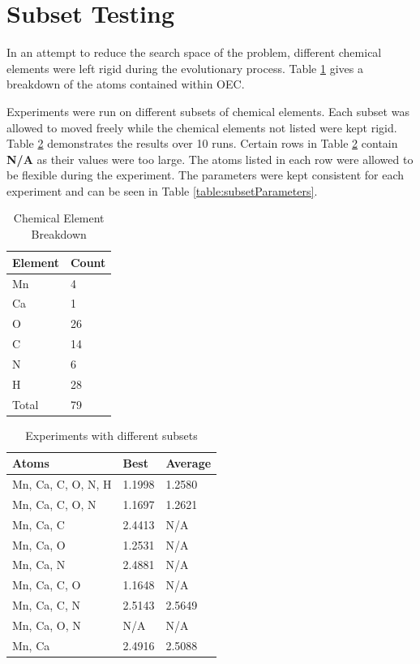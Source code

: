 \documentclass[conference]{IEEEtran}
\begin{document}
\section{Subset Testing}
\label{sec:subsetTesting}

In an attempt to reduce the search space of the problem, different chemical elements were left rigid during the evolutionary process. Table \ref{table:elementBreakdown} gives a breakdown of the atoms contained within OEC.

Experiments were run on different subsets of chemical elements. Each subset was allowed to moved freely while the chemical elements not listed were kept rigid. Table \ref{table:subsetResults} demonstrates the results over 10 runs. Certain rows in Table \ref{table:subsetResults} contain \textbf{N/A} as their values were too large. The atoms listed in each row were allowed to be flexible during the experiment. The parameters were kept consistent for each experiment and can be seen in Table \ref{table:subsetParameters}.

\begin{table}
\caption{Chemical Element Breakdown}
\label{table:elementBreakdown}
\centering
\normalsize
\begin{tabular}{ | l | l | }
  \hline
    Element & Count \\ \hline
    Mn & 4 \\ \hline
    Ca & 1 \\ \hline
    O & 26 \\ \hline
    C & 14 \\ \hline
    N & 6 \\ \hline
    H & 28 \\ \hline
    Total & 79 \\ \hline
\end{tabular}
\end{table}

\begin{table}
  \caption{Experiments with different subsets}
  \label{table:subsetResults}
  \centering
  \normalsize
  \begin{tabular}{ | l | l | l | }
    \hline
    Atoms & Best & Average \\ \hline \hline
    Mn, Ca, C, O, N, H & 1.1998 & 1.2580 \\ \hline
    Mn, Ca, C, O, N & 1.1697 & 1.2621 \\ \hline
    Mn, Ca, C & 2.4413 & N/A \\ \hline
    Mn, Ca, O & 1.2531 & N/A \\ \hline
    Mn, Ca, N & 2.4881 & N/A \\ \hline
    Mn, Ca, C, O & 1.1648 & N/A \\ \hline
    Mn, Ca, C, N & 2.5143 & 2.5649 \\ \hline
    Mn, Ca, O, N & N/A & N/A \\ \hline
    Mn, Ca & 2.4916 & 2.5088 \\ \hline
  \end{tabular}
\end{table}
\end{document}
